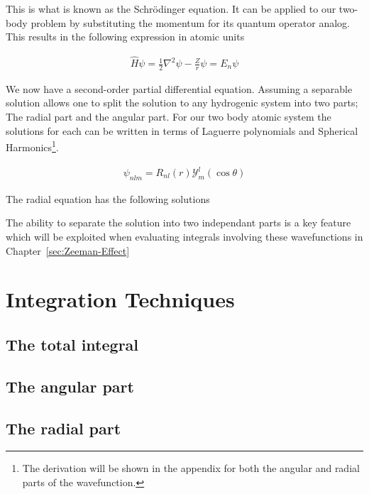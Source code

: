         This is what is known as the Schrödinger equation. It can be applied to our two-body problem by substituting the momentum for its quantum operator analog. This results in the following expression in atomic units 

        \begin{align}
            \hat{H} \psi  = \frac{1}{2} \nabla^2 \psi - \frac{Z}{r} \psi = E_n \psi 
        \end{align}

        We now have a second-order partial differential equation. Assuming a separable solution allows one to split the solution to any hydrogenic system into two parts; The radial part and the angular part. For our two body atomic system the solutions for each can be written in terms of Laguerre polynomials and Spherical Harmonics\footnote{The derivation will be shown in the appendix for both the angular and radial parts of the wavefunction.}.

        \begin{align}
            \psi_{nlm} = R_{nl}(r) \mathcal{Y}^l_m (\cos \theta)
        \end{align}

        \noindent The radial equation has the following solutions 

            

        The ability to separate the solution into two independant parts is a key feature which will be exploited when evaluating integrals involving these wavefunctions in Chapter~\ref{sec:Zeeman-Effect}

    \section{Integration Techniques} \label{sec:Integration_Techniques}
        \subsection{The total integral} \label{sec:The_Total_Integral}
        \subsection{The angular part} \label{sec:The_Angular_Part}
        \subsection{The radial part} \label{sec:The_Radial_Part}


